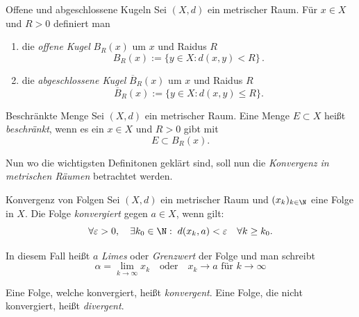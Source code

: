 \begin{definition}{Offene und abgeschlossene Kugeln}
    Sei $(X,d)$ ein metrischer Raum. Für $x \in X$ und $R>0$ definiert man
    \begin{enumerate}
        \item die \emph{offene Kugel} $B_R(x)$ um $x$ und Raidus $R$
        $$
            B_R(x) := \{y \in X : d(x,y) < R\} \, .
        $$

        \item die \emph{abgeschlossene Kugel} $\overline{B}_R(x)$ um $x$ und Raidus $R$
        $$
        \overline{B}_R(x) := \{y \in X : d(x,y) \le R\}.
        $$
    \end{enumerate}
\end{definition}

\begin{definition}{Beschränkte Menge}
    Sei $(X,d)$ ein metrischer Raum. Eine Menge $E \subset X$ heißt \emph{beschränkt}, wenn es ein $x \in X$ und $R>0$ gibt mit
    $$
        E \subset B_R(x).
    $$
\end{definition}

Nun wo die wichtigsten Definitonen geklärt sind, soll nun die \emph{ Konvergenz in metrischen Räumen} betrachtet werden.

\begin{definition}{Konvergenz von Folgen}
    Sei $(X,d)$ ein metrischer Raum und $(x_k)_{k\in\N}$ eine Folge in $X$. Die Folge \emph{konvergiert} gegen $a \in X$, wenn gilt:
    $$
        \forall \varepsilon>0, \quad \exists k_0 \in \N:\; d(x_k,a) < \varepsilon \quad \forall k \ge k_0.
    $$

    In diesem Fall heißt $a$ \emph{Limes} oder \emph{Grenzwert} der Folge und man schreibt 
    $$
        \alpha = \lim\limits_{k \to \infty} x_k \quad \text{oder} \quad x_k \to a \text{ für } k \to \infty
    $$

    Eine Folge, welche konvergiert, heißt \emph{konvergent}. Eine Folge, die nicht konvergiert, heißt \emph{divergent}.
\end{definition}

